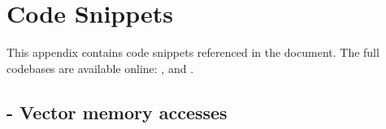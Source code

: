 \chapter{Code Snippets}
This appendix contains code snippets referenced in the document.
The full codebases are available online: , and .

\section{ - Vector memory accesses}\label{appx:code:vector_mem_access}
\begin{mdframed}[backgroundcolor=light-gray]
\inputminted[linenos,breaklines=true]{rust}{./code/vector_accesses_snippet.rs}
\end{mdframed}